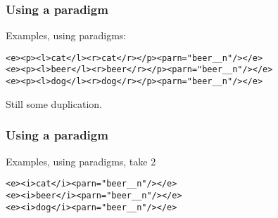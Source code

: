 \documentclass{beamer} %
\begin{document}
\begin{frame}
  \frametitle{Using a paradigm}

  \begin{exampleblock}{Examples, using paradigms:}
    \begin{footnotesize}
    \begin{alltt}
      <e><p><l>cat</l><r>cat</r></p><par n="beer\_\_n"/></e> \\
      <e><p><l>beer</l><r>beer</r></p><par n="beer\_\_n"/></e> \\
      <e><p><l>dog</l><r>dog</r></p><par n="beer\_\_n"/></e> \\
    \end{alltt}
    \end{footnotesize}
\end{exampleblock}

\pause
Still some duplication.
\end{frame}

\begin{frame}
  \frametitle{Using a paradigm}

  \begin{exampleblock}{Examples, using paradigms, take 2}
    \begin{footnotesize}
    \begin{alltt}
      <e><i>cat</i><par n="beer\_\_n"/></e> \\
      <e><i>beer</i><par n="beer\_\_n"/></e> \\
      <e><i>dog</i><par n="beer\_\_n"/></e> \\
    \end{alltt}
    \end{footnotesize}
\end{exampleblock}

\end{frame}
\end{document}
